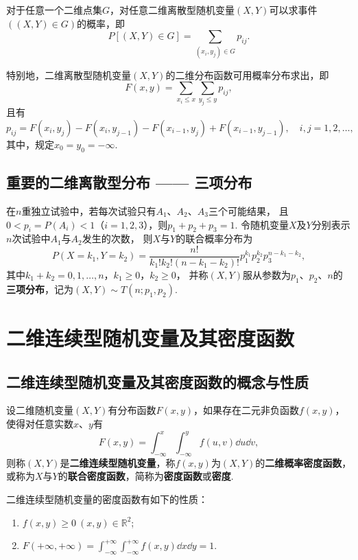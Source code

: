\begin{theorem}
对于任意一个二维点集\(G\)，对任意二维离散型随机变量\((X,Y)\)可以求事件\(((X,Y) \in G)\)的概率，即\[
P\left[(X,Y) \in G\right] = \sum_{(x_i,y_j) \in G} p_{ij}.
\]

特别地，二维离散型随机变量\((X,Y)\)的二维分布函数可用概率分布求出，即\[
F(x,y) = \sum_{x_i \leqslant x}\sum_{y_j \leqslant y} p_{ij},
\]且有\[
p_{ij} = F(x_i,y_j) - F(x_i,y_{j-1}) - F(x_{i-1},y_j) + F(x_{i-1},y_{j-1}), \quad i,j = 1,2,\dotsc,
\]其中，规定\(x_0 = y_0 = -\infty\).
\end{theorem}

\subsection{重要的二维离散型分布 —— 三项分布}
\begin{definition}
在\(n\)重独立试验中，若每次试验只有\(A_1\)、\(A_2\)、\(A_3\)三个可能结果，%
且\(0 < p_i = P(A_i) < 1\)（\(i=1,2,3\)），则\(p_1 + p_2 + p_3 = 1\).
令随机变量\(X\)及\(Y\)分别表示\(n\)次试验中\(A_1\)与\(A_2\)发生的次数，%
则\(X\)与\(Y\)的联合概率分布为\[
P(X=k_1,Y=k_2) = \frac{n!}{k_1! k_2! (n-k_1-k_2)!} p_1^{k_1} p_2^{k_2} p_3^{n-k_1-k_2},
\]其中\(k_1+k_2 = 0,1,\dotsc,n\)，\(k_1 \geqslant 0\)，\(k_2 \geqslant 0\)，%
并称\((X,Y)\)服从参数为\(p _1\)、\(p_2\)、\(n\)的\textbf{三项分布}，记为\((X,Y) \sim T(n;p_1,p_2)\).
\end{definition}

\section{二维连续型随机变量及其密度函数}

\subsection{二维连续型随机变量及其密度函数的概念与性质}

\begin{definition}
设二维随机变量\((X,Y)\)有分布函数\(F(x,y)\)，如果存在二元非负函数\(f(x,y)\)，使得对任意实数\(x\)、\(y\)有\[
F(x,y) = \int_{-\infty}^x \int_{-\infty}^y f(u,v) \dd{u} \dd{v},
\]则称\((X,Y)\)是\textbf{二维连续型随机变量}，称\(f(x,y)\)为\((X,Y)\)的\textbf{二维概率密度函数}，%
或称为\(X\)与\(Y\)的\textbf{联合密度函数}，简称为\textbf{密度函数}或\textbf{密度}.
\end{definition}

\begin{property}
二维连续型随机变量的密度函数有如下的性质：
\begin{enumerate}
\item \(f(x,y) \geqslant 0\ (x,y)\in\mathbb{R}^2\);
\item \(F(+\infty,+\infty) = \int_{-\infty}^{+\infty} \int_{-\infty}^{+\infty} f(x,y) \dd{x} \dd{y} = 1\).
\end{enumerate}
\end{property}

